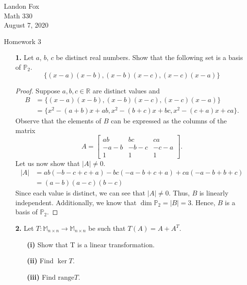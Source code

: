 \documentclass[ 12pt ]{article}
\begin{document}
\noindent Landon Fox \\
\noindent Math 330 \\
\noindent August 7, 2020

\begin{center}
\Large Homework 3
\end{center}

\begin{enumerate}
	\item[\textbf{1.}] Let $a$, $b$, $c$ be distinct real numbers. Show that the following set is a basis of $\mathbb{P}_2$. $$\{ (x-a)(x-b), (x-b)(x-c), (x-c)(x-a) \}$$

		\begin{proof}
			Suppose $a, b, c \in \mathbb{R}$ are distinct values and
			\begin{align*}
				B &= \{ (x-a)(x-b), (x-b)(x-c), (x-c)(x-a) \} \\
				&= \{ x^2 - (a+b)x + ab, x^2 - (b+c)x + bc, x^2 - (c+a)x + ca \}.
			\end{align*}
			Observe that the elements of $B$ can be expressed as the columns of the matrix $$A = \begin{bmatrix} ab & bc & ca \\ -a-b & -b-c & -c-a \\ 1 & 1 & 1 \end{bmatrix}.$$
			Let us now show that $|A| \neq 0$.
			\begin{align*}
				|A| &= ab(-b-c + c+a) - bc(-a-b + c+a) + ca(-a-b + b+c) \\
				&= (a-b)(a-c)(b-c)
			\end{align*}
			Since each value is distinct, we can see that $|A| \neq 0$. Thus, $B$ is linearly independent. Additionally, we know that $\dim \mathbb{P}_2 = |B| = 3$. Hence,
			$B$ is a basis of $\mathbb{P}_2$.
		\end{proof}


	\item[\textbf{2.}] Let $T : \mathbb{M}_{n \times n} \to \mathbb{M}_{n \times n}$ be such that $T(A) = A + A^T$.
		\begin{enumerate}
			\item[\textbf{(i)}] Show that T is a linear transformation.
			\item[\textbf{(ii)}] Find $\ker T$.
			\item[\textbf{(iii)}] Find $\mathrm{range} T$.
		\end{enumerate}


\end{enumerate}
\end{document}
